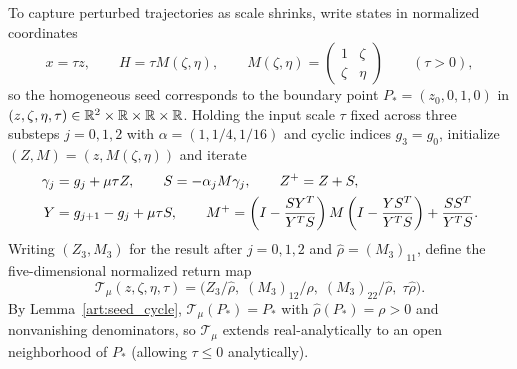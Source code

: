 To capture perturbed trajectories as scale shrinks, write states in normalized
coordinates
\[
 x=\tau z,\qquad H=\tau M(\zeta,\eta),\qquad
 M(\zeta,\eta)=\begin{pmatrix}1&\zeta\\\zeta&\eta\end{pmatrix}\qquad(\tau>0),
\]
so the homogeneous seed corresponds to the boundary point $P_*=(z_0,0,1,0)$ in
$(z,\zeta,\eta,\tau)\in\mathbb R^2\times\mathbb R\times\mathbb R\times\mathbb R$. Holding the input scale
$\tau$ fixed across three substeps $j=0,1,2$ with $\alpha=(1,1/4,1/16)$ and
cyclic indices $g_3=g_0$, initialize $(Z,M)=(z,M(\zeta,\eta))$ and iterate
\begin{align}
 \gamma_j&=g_j+\mu\tau Z,\qquad S=-\alpha_jM\gamma_j,
       \qquad Z^+=Z+S,\label{art:lower_return_substep}\\
 Y&=g_{j+1}-g_j+\mu\tau S,\qquad
 M^+=\left(I-\frac{SY^T}{Y^TS}\right)M
          \left(I-\frac{YS^T}{Y^TS}\right)+\frac{SS^T}{Y^TS}.\notag
\end{align}
Writing $(Z_3,M_3)$ for the result after $j=0,1,2$ and $\hat\rho=(M_3)_{11}$,
define the five-dimensional normalized return map
\begin{equation}\label{art:lower_return}
 \mathcal T_\mu(z,\zeta,\eta,\tau)
 =\bigl(Z_3/\hat\rho,\;(M_3)_{12}/\hat\rho,\;(M_3)_{22}/\hat\rho,\;\tau\hat\rho\bigr).
\end{equation}
By Lemma~\ref{art:seed_cycle}, $\mathcal T_\mu(P_*)=P_*$ with $\hat\rho(P_*)=\rho>0$
and nonvanishing denominators, so $\mathcal T_\mu$ extends real-analytically to
an open neighborhood of $P_*$ (allowing $\tau\le0$ analytically).

